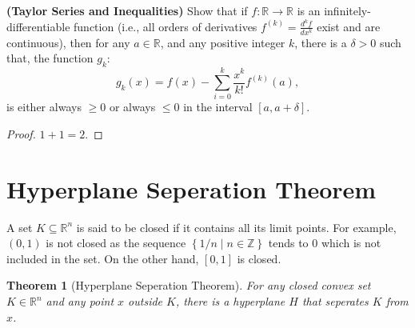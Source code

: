 \documentclass[solution,addpoints,12pt]{exam}
\newtheorem{theorem}{Theorem}
\newcommand{\curly}[1]{\left\{ #1 \right\}}
\newcommand{\reals}{\mathbb{R}}
\newcommand{\integers}{\mathbb{Z}}
\begin{document}
\begin{questions}


\question[10] \textbf{(Taylor Series and Inequalities)}  Show that if $f: \reals \to \reals$ is an infinitely-differentiable function (i.e., all orders of derivatives $f^{(k)} = \frac{d^k f}{dx^k}$ exist and are continuous), then for any $a \in \reals$, and any positive integer $k$, there is a $\delta > 0$ such that, the function $g_k$:
$$ g_k(x) = f(x) - \sum_{i=0}^{k} \frac{x^k}{k!} f^{(k)}(a),$$
is either always $\ge 0$ or always $\le 0$ in the interval $[a, a+\delta]$.

  \begin{solution}
  \begin{proof}
  $1 + 1 = 2$.
  \end{proof}
  \end{solution}

\end{questions}

\appendix

\section*{Hyperplane Seperation Theorem}

A set $K \subseteq \reals^n$ is said to be closed if it contains all its limit points.  For example, $(0, 1)$ is not closed as the sequence $\curly{1/n \mid n \in \integers}$ tends to $0$ which is not included in the set.  On the other hand, $[0, 1]$ is closed.

\begin{theorem}[Hyperplane Seperation Theorem]  For any closed convex set $K \in \reals^n$ and any point $x$ outside $K$, there is a hyperplane $H$ that seperates $K$ from $x$.
\end{theorem}
\end{document}
